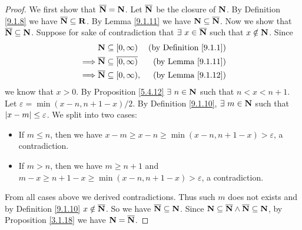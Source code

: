 \begin{proof}
    We first show that \(\overline{\mathbf{N}} = \mathbf{N}\).
    Let \(\overline{\mathbf{N}}\) be the closure of \(\mathbf{N}\).
    By Definition \ref{9.1.8} we have \(\overline{\mathbf{N}} \subseteq \mathbf{R}\).
    By Lemma \ref{9.1.11} we have \(\mathbf{N} \subseteq \overline{\mathbf{N}}\).
    Now we show that \(\overline{\mathbf{N}} \subseteq \mathbf{N}\).
    Suppose for sake of contradiction that \(\exists\ x \in \overline{\mathbf{N}}\) such that \(x \notin \mathbf{N}\).
    Since
    \begin{align*}
                 & \mathbf{N} \subseteq [0, \infty)                       & \text{(by Definition \ref{9.1.1})} \\
        \implies & \overline{\mathbf{N}} \subseteq \overline{[0, \infty)} & \text{(by Lemma \ref{9.1.11})}     \\
        \implies & \overline{\mathbf{N}} \subseteq [0, \infty),           & \text{(by Lemma \ref{9.1.12})}
    \end{align*}
    we know that \(x > 0\).
    By Proposition \ref{5.4.12} \(\exists\ n \in \N\) such that \(n < x < n + 1\).
    Let \(\varepsilon = \min(x - n, n + 1 - x) / 2\).
    By Definition \ref{9.1.10}, \(\exists\ m \in \mathbf{N}\) such that \(\left\lvert x - m\right\rvert \leq \varepsilon\).
    We split into two cases:
    \begin{itemize}
        \item If \(m \leq n\), then we have \(x - m \geq x - n \geq \min(x - n, n + 1 - x) > \varepsilon\), a contradiction.
        \item If \(m > n\), then we have \(m \geq n + 1\) and \(m - x \geq n + 1 - x \geq \min(x - n, n + 1 - x) > \varepsilon\), a contradiction.
    \end{itemize}
    From all cases above we derived contradictions.
    Thus such \(m\) does not exists and by Definition \ref{9.1.10} \(x \notin \overline{\mathbf{N}}\).
    So we have \(\overline{\mathbf{N}} \subseteq \mathbf{N}\).
    Since \(\mathbf{N} \subseteq \overline{\mathbf{N}} \land \overline{\mathbf{N}} \subseteq \mathbf{N}\), by Proposition \ref{3.1.18} we have \(\mathbf{N} = \overline{\mathbf{N}}\).


\end{proof}

